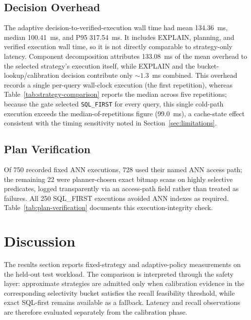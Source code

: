 \documentclass[conference]{IEEEtran}
\begin{document}
\subsection{Decision Overhead}
The adaptive decision-to-verified-execution wall time had mean 134.36~ms, median 100.41~ms, and P95 317.54~ms. It includes EXPLAIN, planning, and verified execution wall time, so it is not directly comparable to strategy-only latency. Component decomposition attributes 133.08~ms of the mean overhead to the selected strategy's execution itself, while EXPLAIN and the bucket-lookup/calibration decision contribute only ${\sim}1.3$~ms combined. This overhead records a single per-query wall-clock execution (the first repetition), whereas Table~\ref{tab:strategy-comparison} reports the median across five repetitions; because the gate selected \texttt{SQL\_FIRST} for every query, this single cold-path execution exceeds the median-of-repetitions figure (99.0~ms), a cache-state effect consistent with the timing sensitivity noted in Section~\ref{sec:limitations}.


\subsection{Plan Verification}
Of 750 recorded fixed ANN executions, 728 used their named ANN access path; the remaining 22 were planner-chosen exact bitmap scans on highly selective predicates, logged transparently via an access-path field rather than treated as failures. All 250 SQL\_FIRST executions avoided ANN indexes as required. Table~\ref{tab:plan-verification} documents this execution-integrity check.


\section{Discussion}
The results section reports fixed-strategy and adaptive-policy measurements on the held-out test workload. The comparison is interpreted through the safety layer: approximate strategies are admitted only when calibration evidence in the corresponding selectivity bucket satisfies the recall feasibility threshold, while exact SQL-first remains available as a fallback. Latency and recall observations are therefore evaluated separately from the calibration phase.
\end{document}
